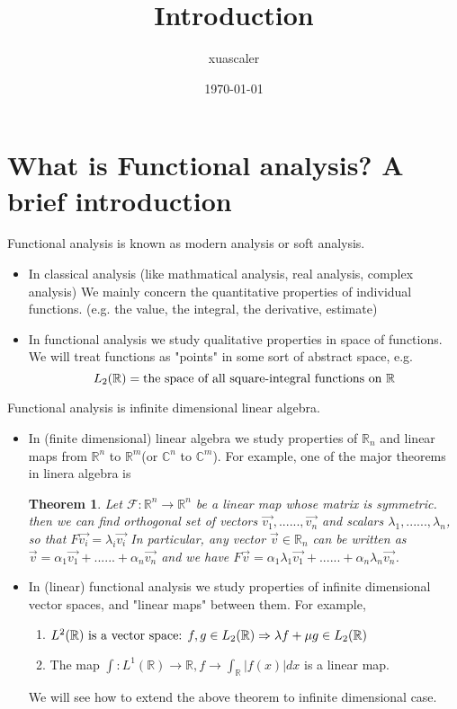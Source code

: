 \documentclass{article}
\title{Introduction}
\author{xuascaler}
\date{\today}
\newtheorem*{theorem}{Theorem}
\begin{document}
\maketitle

\section*{What is Functional analysis? A brief introduction}
Functional analysis is known as modern analysis or soft analysis.
\begin{itemize}
    \item In classical analysis (like mathmatical analysis, real analysis, complex analysis)
    We mainly concern the quantitative properties of individual functions.
    (e.g. the value, the integral, the derivative, estimate)
    \item In functional analysis we study qualitative properties in space of functions.
    We will treat functions as "points" in some sort of abstract space, e.g.
    \[
        L_2(\mathbb{R}) = \textnormal{the space of all square-integral functions on } \mathbb{R}
    \]
\end{itemize}
Functional analysis is infinite dimensional linear algebra.
\begin{itemize}
    \item In (finite dimensional) linear algebra we study properties of $\mathbb{R}_n$ and 
    linear maps from $\mathbb{R}^n$ to $\mathbb{R}^m$(or $\mathbb{C}^n$ to $\mathbb{C}^m$).
    For example, one of the major theorems in linera algebra is
    \begin{theorem}
        Let $\mathcal{F}:\mathbb{R}^n \rightarrow \mathbb{R}^n$ be a linear map whose matrix is symmetric.
        then we can find orthogonal set of vectors $\overrightarrow{v_{1}}, ......, \overrightarrow{v_{n}}$
        and scalars $\lambda_1,......,\lambda_n$, so that $F\overrightarrow{v_i}=\lambda_{i}\overrightarrow{v_{i}}$
        In particular, any vector $\overrightarrow{v} \in \mathbb{R}_{n}$ can be written as
        $\overrightarrow{v} = \alpha_1\overrightarrow{v_1} + ...... + \alpha_n\overrightarrow{v_n}$
        and we have 
        $F\overrightarrow{v} = \alpha_1\lambda_1\overrightarrow{v_1} +......+\alpha_n\lambda_n\overrightarrow{v_n}$.
    \end{theorem}
    \item In (linear) functional analysis we study properties of infinite dimensional vector spaces,
    and "linear maps" between them. For example,
    \begin{enumerate}
        \item $L^2(\mathbb{R}) \textnormal{ is a vector space: } f, g \in L_2(\mathbb{R}) \Rightarrow \lambda f + \mu g \in L_2(\mathbb{R})$
        \item The map $\int : L^1(\mathbb{R}) \rightarrow \mathbb{R}, f \rightarrow \int_{\mathbb{R}}{|f(x)|}dx$ is a linear map.
    \end{enumerate}
    We will see how to extend the above theorem to infinite dimensional case.
\end{itemize}
\end{document}
